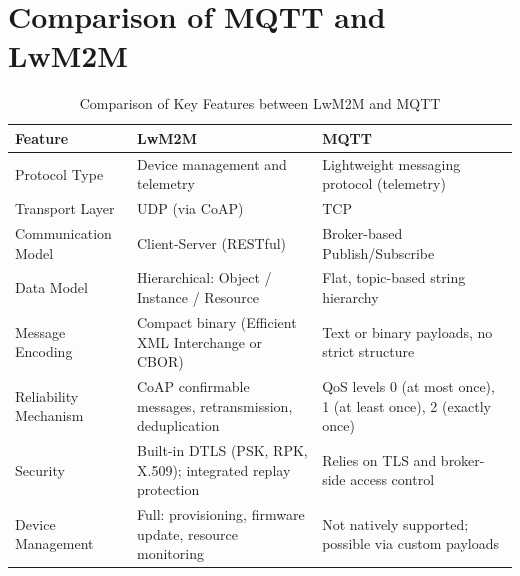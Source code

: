 \documentclass[12pt, english, openany]{book}
\begin{document}
\FloatBarrier



\section{Comparison of MQTT and LwM2M} \label{sec:comparison_mqtt_lwm2m}
\begin{table}[htbp]
    \centering
    \caption{Comparison of Key Features between LwM2M and MQTT}
    \label{tab:lwm2m_vs_mqtt}
    \begin{tabularx}{\textwidth}{|l|X|X|}
        \hline
        \textbf{Feature}                    & \textbf{LwM2M}                                                & \textbf{MQTT}                                                    \\ \hline
        Protocol Type                       & Device management and telemetry                               & Lightweight messaging protocol (telemetry)                       \\ \hline
        Transport Layer                     & UDP (via CoAP)                                                & TCP                                                              \\ \hline
        Communication Model                 & Client-Server (RESTful)                                       & Broker-based Publish/Subscribe                                   \\ \hline
        Data Model                          & Hierarchical: Object / Instance / Resource                    & Flat, topic-based string hierarchy                               \\ \hline
        Message Encoding                    & Compact binary (Efficient XML Interchange or CBOR)            & Text or binary payloads, no strict structure                     \\ \hline
        Reliability Mechanism               & CoAP confirmable messages, retransmission, deduplication      & QoS levels 0 (at most once), 1 (at least once), 2 (exactly once) \\ \hline
        Security                            & Built-in DTLS (PSK, RPK, X.509); integrated replay protection & Relies on TLS and broker-side access control                     \\ \hline
        Device Management                   & Full: provisioning, firmware update, resource monitoring      & Not natively supported; possible via custom payloads             \\ \hline

\end{tabularx}
\end{table}
\end{document}

